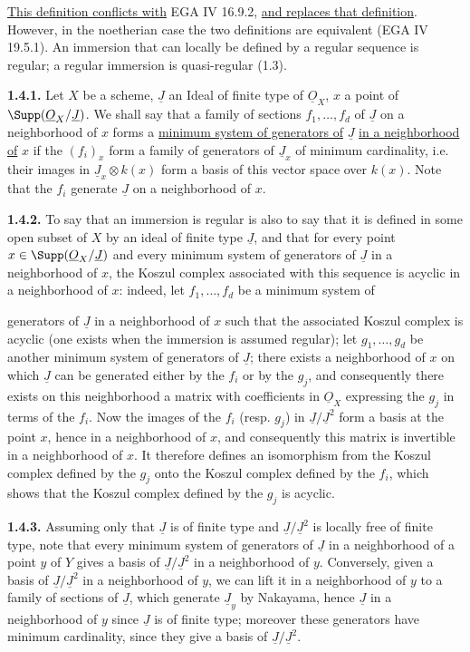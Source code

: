 \uline{This definition conflicts with} EGA IV 16.9.2, \uline{and replaces that definition}. However, in the noetherian case the two definitions are equivalent (EGA IV 19.5.1). An immersion that can locally be defined by a regular sequence is regular; a regular immersion is quasi-regular (1.3).

\textbf{1.4.1.} Let $X$ be a scheme, $\underline{J}$ an Ideal of finite type of $\underline{O}_X$, $x$ a point of $\Supp(\underline{O}_X/\underline{J})$. We shall say that a family of sections $f_1,\ldots,f_d$ of $\underline{J}$ on a neighborhood of $x$ forms a \uline{minimum system of generators of} $\underline{J}$ \uline{in a neighborhood of} $x$ if the $(f_i)_x$ form a family of generators of $\underline{J}_x$ of minimum cardinality, i.e. their images in $\underline{J}_x\otimes k(x)$ form a basis of this vector space over $k(x)$. Note that the $f_i$ generate $\underline{J}$ on a neighborhood of $x$.

\textbf{1.4.2.} To say that an immersion is regular is also to say that it is defined in some open subset of $X$ by an ideal of finite type $\underline{J}$, and that for every point $x\in\Supp(\underline{O}_X/\underline{J})$ and every minimum system of generators of $\underline{J}$ in a neighborhood of $x$, the Koszul complex associated with this sequence is acyclic in a neighborhood of $x$: indeed, let $f_1,\ldots,f_d$ be a minimum system of

%
generators of $\underline{J}$ in a neighborhood of $x$ such that the associated Koszul complex is acyclic (one exists when the immersion is assumed regular); let $g_1,\ldots,g_d$ be another minimum system of generators of $\underline{J}$; there exists a neighborhood of $x$ on which $\underline{J}$ can be generated either by the $f_i$ or by the $g_j$, and consequently there exists on this neighborhood a matrix with coefficients in $\underline{O}_X$ expressing the $g_j$ in terms of the $f_i$. Now the images of the $f_i$ (resp. $g_j$) in $\underline{J}/\underline{J}^2$ form a basis at the point $x$, hence in a neighborhood of $x$, and consequently this matrix is invertible in a neighborhood of $x$. It therefore defines an isomorphism from the Koszul complex defined by the $g_j$ onto the Koszul complex defined by the $f_i$, which shows that the Koszul complex defined by the $g_j$ is acyclic.

\textbf{1.4.3.} Assuming only that $\underline{J}$ is of finite type and $\underline{J}/\underline{J}^2$ is locally free of finite type, note that every minimum system of generators of $\underline{J}$ in a neighborhood of a point $y$ of $Y$ gives a basis of $\underline{J}/\underline{J}^2$ in a neighborhood of $y$. Conversely, given a basis of $\underline{J}/\underline{J}^2$ in a neighborhood of $y$, we can lift it in a neighborhood of $y$ to a family of sections of $\underline{J}$, which generate $\underline{J}_y$ by Nakayama, hence $\underline{J}$ in a neighborhood of $y$ since $\underline{J}$ is of finite type; moreover these generators have minimum cardinality, since they give a basis of $\underline{J}/\underline{J}^2$.

